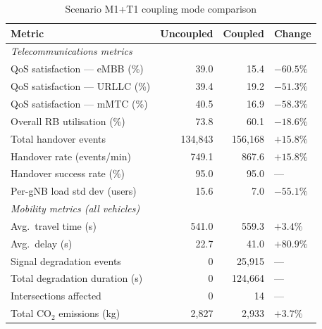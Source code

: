 \begin{table}[h]
    \centering
    \caption{Scenario M1+T1 coupling mode comparison}
    \label{tab:m1t1_results}
    \begin{tabular}{lrrl}
        \toprule
        \textbf{Metric} & \textbf{Uncoupled} & \textbf{Coupled} & \textbf{Change} \\
        \midrule
        \multicolumn{4}{l}{\textit{Telecommunications metrics}} \\
        QoS satisfaction --- eMBB (\%)    & 39.0  & 15.4   & $-60.5\%$ \\
        QoS satisfaction --- URLLC (\%)   & 39.4  & 19.2   & $-51.3\%$ \\
        QoS satisfaction --- mMTC (\%)    & 40.5  & 16.9   & $-58.3\%$ \\
        Overall RB utilisation (\%)       & 73.8  & 60.1   & $-18.6\%$ \\
        Total handover events             & 134{,}843 & 156{,}168 & $+15.8\%$ \\
        Handover rate (events/min)        & 749.1 & 867.6  & $+15.8\%$ \\
        Handover success rate (\%)        & 95.0  & 95.0   & ---        \\
        Per-gNB load std dev (users)      & 15.6  & 7.0    & $-55.1\%$ \\
        \midrule
        \multicolumn{4}{l}{\textit{Mobility metrics (all vehicles)}} \\
        Avg.\ travel time (s)             & 541.0 & 559.3  & $+3.4\%$   \\
        Avg.\ delay (s)                   & 22.7  & 41.0   & $+80.9\%$  \\
        Signal degradation events         & 0     & 25{,}915 & ---        \\
        Total degradation duration (s)    & 0     & 124{,}664 & ---       \\
        Intersections affected            & 0     & 14     & ---          \\
        Total CO$_2$ emissions (kg)       & 2{,}827 & 2{,}933 & $+3.7\%$ \\
        \bottomrule
    \end{tabular}
\end{table}

